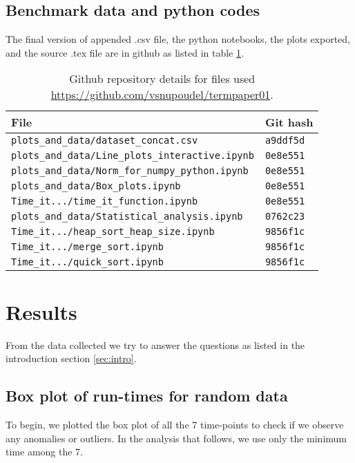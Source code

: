 \documentclass[sigconf, nonacm, natbib, screen, balance=False]{acmart}
\begin{document}
\subsection{Benchmark data and python codes}\label{sec:githubfiles}
The final version of appended .csv file, the python notebooks, the plots exported, and the source .tex file are in github as listed in table \ref{tab:hashes}.

\begin{table}[ht]
\caption{Github repository details for files used 
\url{https://github.com/vsnupoudel/termpaper01}.}
\label{tab:hashes}
\begin{tabular}{|l|l|}
\hline
File & Git hash 
\\\hline
\verb!plots_and_data/dataset_concat.csv! & \verb!a9ddf5d! \\
\verb!plots_and_data/Line_plots_interactive.ipynb! & \verb!0e8e551! \\
\verb!plots_and_data/Norm_for_numpy_python.ipynb! & \verb!0e8e551! \\
\verb!plots_and_data/Box_plots.ipynb! & \verb!0e8e551! \\
\verb!Time_it.../time_it_function.ipynb! & \verb!0e8e551! \\
\verb!plots_and_data/Statistical_analysis.ipynb! & \verb!0762c23! \\
\verb!Time_it.../heap_sort_heap_size.ipynb!	& \verb!9856f1c! \\
\verb!Time_it.../merge_sort.ipynb! & \verb!9856f1c! \\
\verb!Time_it.../quick_sort.ipynb! & \verb!9856f1c!  \\
\hline
\end{tabular}
\end{table}

\section{Results}\label{sec:results}
From the data collected we try to answer the questions as listed in the introduction section \ref{sec:intro}.

\subsection{Box plot of run-times for random data }\label{scatter}
To begin, we plotted the box plot of all the 7 time-points to check if we observe any anomalies or outliers. In the analysis that follows, we use only the minimum time among the 7.
\end{document}
